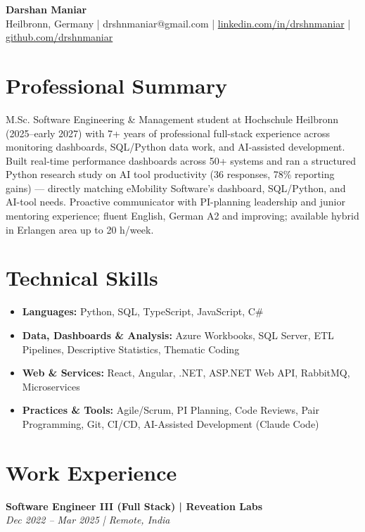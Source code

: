 \documentclass[letterpaper,10pt]{article}
\begin{document}
\begin{center}
{\Large \bfseries Darshan Maniar} \\ \vspace{2pt}
{\small Heilbronn, Germany | drshnmaniar@gmail.com | \href{https://linkedin.com/in/drshnmaniar}{linkedin.com/in/drshnmaniar} | \href{https://github.com/drshnmaniar}{github.com/drshnmaniar}}
\end{center}


\section{Professional Summary}
{\small M.Sc. Software Engineering \& Management student at Hochschule Heilbronn (2025–early 2027) with 7+ years of professional full-stack experience across monitoring dashboards, SQL/Python data work, and AI-assisted development. Built real-time performance dashboards across 50+ systems and ran a structured Python research study on AI tool productivity (36 responses, 78\% reporting gains) — directly matching eMobility Software's dashboard, SQL/Python, and AI-tool needs. Proactive communicator with PI-planning leadership and junior mentoring experience; fluent English, German A2 and improving; available hybrid in Erlangen area up to 20 h/week.}


\section{Technical Skills}
\begin{itemize}[leftmargin=0.15in,topsep=2pt,itemsep=2pt,parsep=0pt]
\item\small{\textbf{Languages:} Python, SQL, TypeScript, JavaScript, C\#}
\item\small{\textbf{Data, Dashboards \& Analysis:} Azure Workbooks, SQL Server, ETL Pipelines, Descriptive Statistics, Thematic Coding}
\item\small{\textbf{Web \& Services:} React, Angular, .NET, ASP.NET Web API, RabbitMQ, Microservices}
\item\small{\textbf{Practices \& Tools:} Agile/Scrum, PI Planning, Code Reviews, Pair Programming, Git, CI/CD, AI-Assisted Development (Claude Code)}
\end{itemize}


\section{Work Experience}

\noindent\textbf{Software Engineer III (Full Stack) | Reveation Labs}\\
{\small\textit{Dec 2022 – Mar 2025 | Remote, India}}\\[-2pt]
\end{document}
